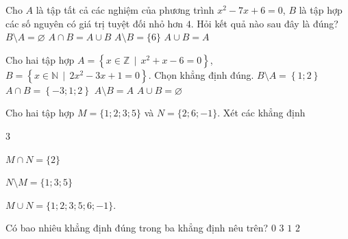 \begin{ex}%
	Cho $A$ là tập tất cả các nghiệm của phương trình $x^2-7x+6=0$, $B$ là tập hợp các số nguyên có giá trị tuyệt đối nhỏ hơn $4$. Hỏi  kết quả nào sau đây là đúng?
	\choice 
		 {$B \setminus A=\varnothing$}
		{$A \cap B=A \cup  B$}
		{\True  $A \setminus B=\{6\}$}
		 {$A \cup B=A$}
\end{ex}

\begin{ex}%
	Cho hai tập hợp $ A=\left\lbrace  x\in \mathbb{Z}\,\mid\, x^2+x-6=0 \right\rbrace$, $ B=\left\lbrace x\in \mathbb{N}\,\mid\, 2x^2-3x+1=0 \right\rbrace $. Chọn khẳng định đúng.
	 \choice
		{$  B\setminus A=\left\lbrace 1;2 \right\rbrace $}
		{$ A \cap B=\left\lbrace -3;1;2  \right\rbrace $}
		{\True $ A\setminus B=A  $}
		{$ A  \cup B=\varnothing$}
\end{ex}

\begin{ex}%
	Cho hai tập hợp  $M=\{1;2;3;5\}$ và $N=\{2;6;-1\}$. Xét các khẳng định
	\begin{enumEX}[(I)]{3}
		\item $M\cap  N=\{2\}$
		 \item $N\setminus M=\{1;3;5\}$
		 \item $M\cup N=\{1;2;3;5;6;-1\}.$
	\end{enumEX}
	Có bao nhiêu khẳng  định đúng trong ba khẳng định nêu trên?
	\choice 
		{$0$} 
		{$3$} 
		 {$1$}
		 {\True $2$}
\end{ex}

